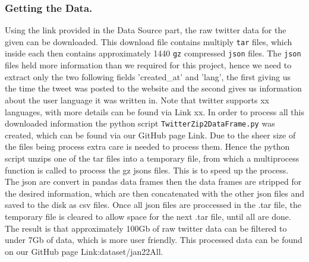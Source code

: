 \documentclass[9pt]{article}
\begin{document}
\subsubsection{Getting the Data.}
Using the link provided in the Data Source part, the raw twitter data for the given can be
downloaded. This download file contains multiply \texttt{tar} files, which inside each
then contains approximately 1440 \texttt{gz} compressed \texttt{json} files. The
\texttt{json} files held more information than we required for this project, hence we need
to extract only the two following fields 'created\_at' and 'lang', the first giving us the
time the tweet was posted to the website and the second gives us information about the
user language it was written in. Note that twitter supports xx languages, with more
details can be found via Link xx.
In order to process all this downloaded information the python script
\texttt{TwitterZip2DataFrame.py} was created, which can be found via our GitHub page Link.
Due to the sheer size of the files being process extra care is needed to process them.
Hence the python script unzips one of the tar files into a temporary file, from which a
multiprocess function is called to process the gz jsons files. 
This is to speed up the process. The json are convert in pandas data frames then the data frames
are stripped for the desired information, which are then concatenated with the other json
files and saved to the disk as csv files.  
Once all json files are proccessed in the .tar file, the temporary file is cleared to allow space 
for the next .tar file, until all are done. The result is that approximately 100Gb of raw twitter 
data can be filtered to under 7Gb of data, which is more user friendly. This processed
data can be found on our GitHub page Link:dataset/jan22All.
\end{document}
